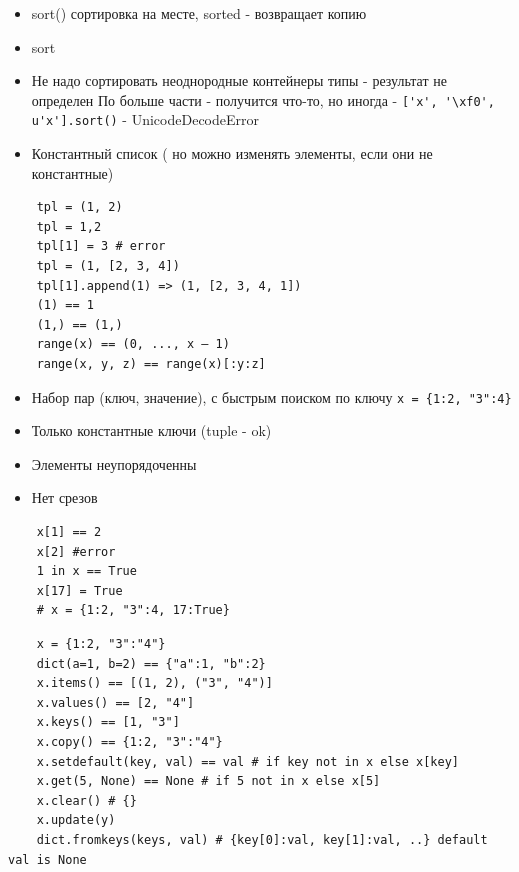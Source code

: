 \documentclass{article}
\begin{document}
\newpage

\begin{itemize}
	\item sort() сортировка на месте, sorted - возвращает копию
	\item sort
	\item Не надо сортировать неоднородные контейнеры типы - результат не определен
		По больше части - получится что-то, но иногда -
		\lstinline!['x', '\xf0', u'x'].sort()! - UnicodeDecodeError
\end{itemize}
\newpage

\begin{itemize}
	\item Константный список ( но можно изменять элементы, если они не константные)
\end{itemize}
\vspace{15pt}
\begin{lstlisting}
	tpl = (1, 2)
	tpl = 1,2
	tpl[1] = 3 # error
	tpl = (1, [2, 3, 4])
	tpl[1].append(1) => (1, [2, 3, 4, 1])
	(1) == 1
	(1,) == (1,)
	range(x) == (0, ..., x – 1)
	range(x, y, z) == range(x)[:y:z]
\end{lstlisting}
\newpage

\begin{itemize}
	\item Набор пар (ключ, значение), с быстрым поиском по ключу
	\lstinline$x = {1:2, "3":4}$
	\item Только константные ключи (tuple - ok)
	\item Элементы неупорядоченны
	\item Нет срезов
\end{itemize}
\vspace{15pt}
\begin{lstlisting}
	x[1] == 2
	x[2] #error
	1 in x == True
	x[17] = True
	# x = {1:2, "3":4, 17:True}
\end{lstlisting}
\newpage

\vspace{15pt}
\begin{lstlisting}
	x = {1:2, "3":"4"}
	dict(a=1, b=2) == {"a":1, "b":2}
	x.items() == [(1, 2), ("3", "4")]
	x.values() == [2, "4"]
	x.keys() == [1, "3"]
	x.copy() == {1:2, "3":"4"}
	x.setdefault(key, val) == val # if key not in x else x[key]
	x.get(5, None) == None # if 5 not in x else x[5]
	x.clear() # {}
	x.update(y)
	dict.fromkeys(keys, val) # {key[0]:val, key[1]:val, ..} default val is None
\end{lstlisting}
\newpage
\end{document}
